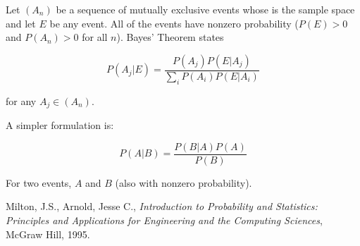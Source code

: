 \documentclass{article}
\begin{document}

Let $(A_n)$ be a sequence of mutually exclusive events whose  is the sample space and let $E$ be any event.  All of the events have nonzero probability ($P(E) > 0$ and $P(A_n) > 0$ for all $n$).  Bayes' Theorem states

$$ P(A_j|E) = \frac{P(A_j)P(E|A_j)}{\sum_i P(A_i)P(E|A_i)} $$

for any $A_j \in (A_n)$.

A simpler formulation is:

$$ P(A|B) = \frac{P(B|A)P(A)}{P(B)} $$

For two events, $A$ and $B$ (also with nonzero probability).  

\begin{thebibliography}{3}
 Milton, J.S., Arnold, Jesse C., \textsl{Introduction to Probability and Statistics: Principles and Applications for Engineering and the Computing Sciences}, McGraw Hill, 1995.
\end{thebibliography}
\end{document}
